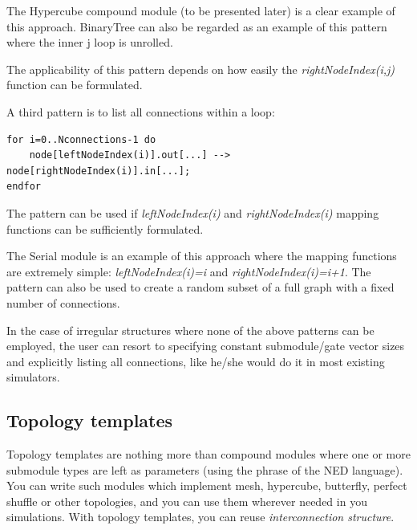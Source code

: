 The Hypercube compound module (to be
presented later) is a clear example of this approach. BinaryTree can
also be regarded as an example of this pattern where the inner j loop
is unrolled.

The applicability of this pattern depends on how easily the \textit{rightNodeIndex(i,j)} 
function can be formulated. 




A third pattern is to list all connections within a loop: 


\begin{Verbatim}[commandchars=\\\{\}]
for i=0..Nconnections-1 do 
    node[leftNodeIndex(i)].out[...] --> node[rightNodeIndex(i)].in[...];
endfor
\end{Verbatim}



The pattern can be used if \textit{leftNodeIndex(i)} and \textit{rightNodeIndex(i)} 
mapping functions can be sufficiently formulated.

The Serial module is an example of this approach where the mapping 
functions are extremely simple: \textit{leftNodeIndex(i)=i} and \textit{rightNodeIndex(i)=i+1}. 
The pattern can also be used to create a random subset of a full 
graph with a fixed number of connections.

In the case of irregular structures where none of the above patterns 
can be employed, the user can resort to specifying constant submodule/gate 
vector sizes and explicitly listing all connections, like he/she 
would do it in most existing simulators.





\subsection{Topology templates}
\label{sec:ch-ned-lang:topology-templates}





Topology templates are nothing more than compound modules where one or
more submodule types are left as parameters (using the
 phrase of the NED language).  You can
write such modules which implement mesh,
hypercube,
butterfly, perfect
shuffle or other topologies, and you
can use them wherever needed in you simulations.  With topology
templates, you can reuse
\textit{interconnection structure}.



